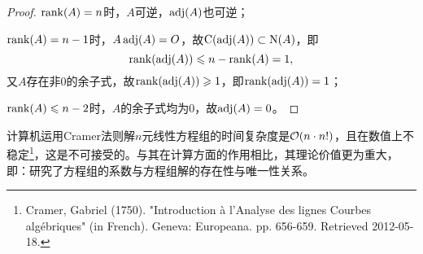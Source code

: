 \begin{proof}
	$\operatorname{rank}(A)=n$时，$A$可逆，$\operatorname{adj}(A)$也可逆；
	
	$\operatorname{rank}(A)=n-1$时，$A\operatorname{adj}(A)=O$，故$\operatorname{C}(\operatorname{adj}(A))\subset\operatorname{N}(A)$，即
	\[
		\operatorname{rank}(\operatorname{adj}(A))\leqslant n-\operatorname{rank}(A)=1,
	\]
	又$A$存在非0的余子式，故$\operatorname{rank}(\operatorname{adj}(A))\geqslant 1$，即$\operatorname{rank}(\operatorname{adj}(A))=1$；

	$\operatorname{rank}(A)\leqslant n-2$时，$A$的余子式均为0，故$\operatorname{adj}(A)=0$。
\end{proof}

\begin{remark}
	计算机运用Cramer法则解$n$元线性方程组的时间复杂度是$\mathcal O(n\cdot n!)$，且在数值上不稳定\footnote{Cramer, Gabriel (1750). "Introduction à l'Analyse des lignes Courbes algébriques" (in French). Geneva: Europeana. pp. 656-659. Retrieved 2012-05-18.}，这是不可接受的。与其在计算方面的作用相比，其理论价值更为重大，即：研究了方程组的系数与方程组解的存在性与唯一性关系。
\end{remark}
